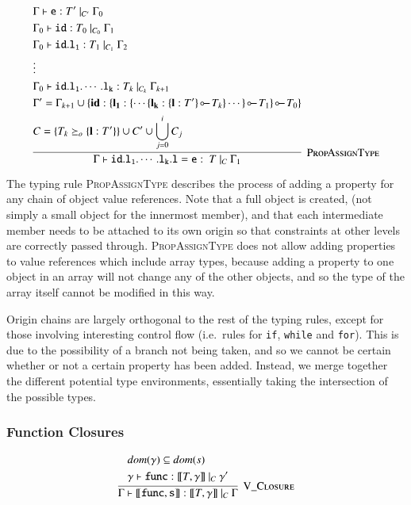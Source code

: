 \documentclass[12pt,a4paper,twoside,openright]{report}
\newcommand*{\js}{\texttt}
\newcommand*{\orig}{\ensuremath{\!\multimapinv\!}}
\begin{document}
$$\infer[\textsc{PropAssignType}]{
  \Gamma\vdash\mathtt{id.l_1.\cdots.l_k.l = e}:\ T\ |_C\ \Gamma_1
}{
  \begin{split}
	&\Gamma\vdash\mathtt{e}:T'\ |_{C'}\ \Gamma_0 \\
	&\Gamma_0\vdash\mathtt{id}:T_0\ |_{C_0}\ \Gamma_1 \\
	&\Gamma_0\vdash\mathtt{id.l_1}:T_1\ |_{C_1}\ \Gamma_2 \\
	&\vdots \\
	&\Gamma_0\vdash\mathtt{id.l_1.\cdots.l_k}:T_k\ |_{C_k}\ \Gamma_{k+1} \\
	&\Gamma' = \Gamma_{k+1}\cup\{\textbf{id}: \{ \mathbf{l_1}: \{\cdots \{\mathbf{l_k}:\{\mathbf{l}: T'\}\orig T_k \} \cdots\} \orig T_1\}\orig T_0\} \\
	&C = \{T_k \succeq_o \{\mathbf{l}:T'\}\} \cup C' \cup \bigcup_{j=0}^{i}{C_j}
  \end{split}
}$$

The typing rule \textsc{PropAssignType} describes the process of adding a
property for any chain of object value references. Note that a full object is
created, (not simply a small object for the innermost member), and that each
intermediate member needs to be attached to its own origin so that constraints
at other levels are correctly passed through. \textsc{PropAssignType} does not
allow adding properties to value references which include array types, because
adding a property to one object in an array will not change any of the other
objects, and so the type of the array itself cannot be modified in this way.

Origin chains are largely orthogonal to the rest of the typing rules, except
for those involving interesting control flow (i.e.~rules for \js{if},
\js{while} and \js{for}). This is due to the possibility of a branch not being
taken, and so we cannot be certain whether or not a certain property has been
added. Instead, we merge together the different potential type environments,
essentially taking the intersection of the possible types.

\subsubsection{Function Closures}
$$
\infer[\textsc{V\_Closure}]{
	\Gamma\vdash\mathtt{[\![func, s]\!]}: [\![T, \gamma]\!]\ |_C\ \Gamma
}{
	\begin{split}
		&dom(\gamma) \subseteq dom(s) \\
		&\gamma \vdash \mathtt{func} : [\![T, \gamma]\!]\ |_C\ \gamma'
	\end{split}
}$$
\end{document}
